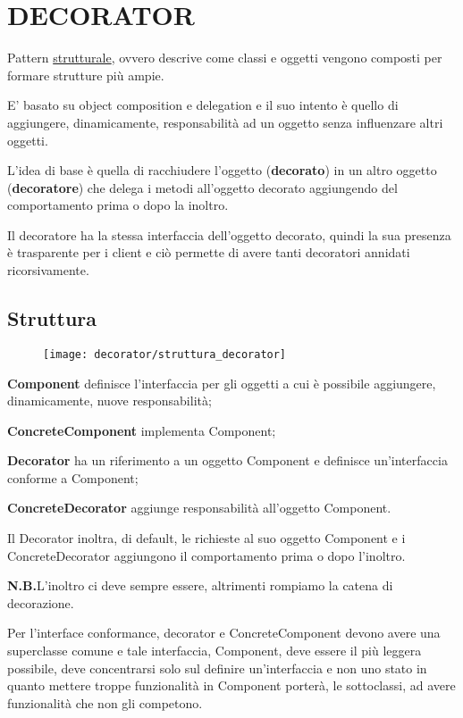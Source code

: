 \chapter{DECORATOR}

Pattern \underline{strutturale}, ovvero descrive come classi e oggetti vengono composti per formare strutture più ampie. 

E' basato su object composition e delegation e il suo intento è quello di aggiungere, dinamicamente, responsabilità ad un oggetto senza influenzare altri oggetti.
\smallskip

L'idea di base è quella di racchiudere l'oggetto (\textbf{decorato}) in un altro oggetto (\textbf{decoratore}) che delega i metodi all'oggetto decorato aggiungendo del 
comportamento prima o dopo la inoltro.

Il decoratore ha la stessa interfaccia dell’oggetto decorato, quindi la sua presenza è trasparente per i client e ciò permette di avere tanti decoratori annidati
ricorsivamente.
\section{Struttura}

\begin{figure}[H]
    \centering
    \texttt{[image: decorator/struttura\_decorator]}    
\end{figure}

\textbf{Component} definisce l'interfaccia per gli oggetti a cui è possibile aggiungere, dinamicamente, nuove responsabilità;

\textbf{ConcreteComponent} implementa Component;

\textbf{Decorator} ha un riferimento a un oggetto Component e definisce un'interfaccia conforme a Component;

\textbf{ConcreteDecorator} aggiunge responsabilità all'oggetto Component.
\medskip

Il Decorator inoltra, di default, le richieste al suo oggetto Component e i ConcreteDecorator aggiungono il comportamento prima o dopo l'inoltro.

\medskip
\textbf{N.B.}L'inoltro ci deve sempre essere, altrimenti rompiamo la catena di decorazione.
\medskip

Per l’interface conformance, decorator e ConcreteComponent devono avere una superclasse comune e tale interfaccia, Component, deve essere il più leggera possibile, 
deve concentrarsi solo sul definire un'interfaccia e non uno stato in quanto mettere troppe funzionalità in Component porterà, le sottoclassi, ad avere funzionalità 
che non gli competono.


